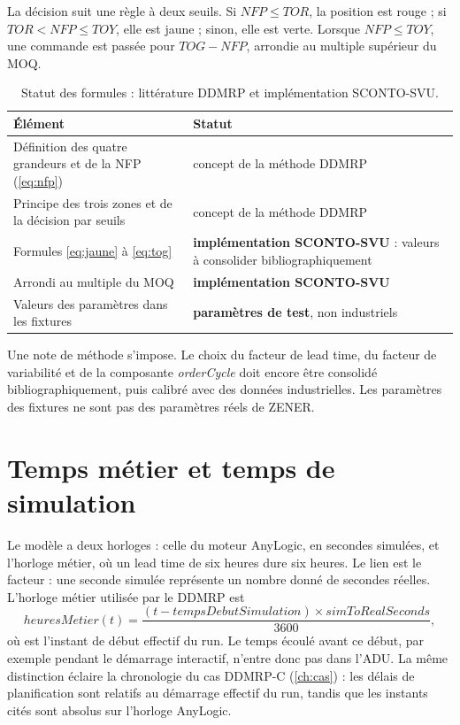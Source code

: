 La décision suit une règle à deux seuils. Si $NFP \le TOR$, la position est rouge ; si
$TOR < NFP \le TOY$, elle est jaune ; sinon, elle est verte. Lorsque $NFP \le TOY$, une
commande est passée pour $TOG - NFP$, arrondie au multiple supérieur du MOQ.

\begin{table}[H]
  \centering
  \caption{Statut des formules : littérature DDMRP et implémentation SCONTO-SVU.}\label{tab:statut-formules}
  \begin{tabularx}{\textwidth}{@{}YY@{}}
    \toprule
    Élément & Statut \\
    \midrule
    Définition des quatre grandeurs et de la NFP (\cref{eq:nfp}) & concept de la méthode DDMRP~\cite{ptak} \\
    Principe des trois zones et de la décision par seuils & concept de la méthode DDMRP~\cite{ptak} \\
    Formules \cref{eq:jaune} à \cref{eq:tog} & \textbf{implémentation SCONTO-SVU} : valeurs à consolider bibliographiquement \\
    Arrondi au multiple du MOQ & \textbf{implémentation SCONTO-SVU} \\
    Valeurs des paramètres dans les fixtures & \textbf{paramètres de test}, non industriels \\
    \bottomrule
  \end{tabularx}
\end{table}

Une note de méthode s'impose. Le choix du facteur de lead time, du facteur de variabilité et
de la composante \emph{orderCycle} doit encore être consolidé bibliographiquement, puis calibré
avec des données industrielles. Les paramètres des fixtures ne sont pas des paramètres réels
de ZENER.

\section{Temps métier et temps de simulation}

Le modèle a deux horloges : celle du moteur AnyLogic, en secondes simulées, et l'horloge
métier, où un lead time de six heures dure six heures. Le lien est le facteur
 : une seconde simulée représente un nombre donné de secondes réelles.
L'horloge métier utilisée par le DDMRP est
\[
heuresMetier(t) = \frac{(t - tempsDebutSimulation)\times simToRealSeconds}{3600},
\]
où  est l'instant de début effectif du run. Le temps écoulé avant ce
début, par exemple pendant le démarrage interactif, n'entre donc pas dans l'ADU. La même distinction
éclaire la chronologie du cas DDMRP-C (\cref{ch:cas}) : les délais de planification sont relatifs au
démarrage effectif du run, tandis que les instants cités sont absolus sur l'horloge AnyLogic.

